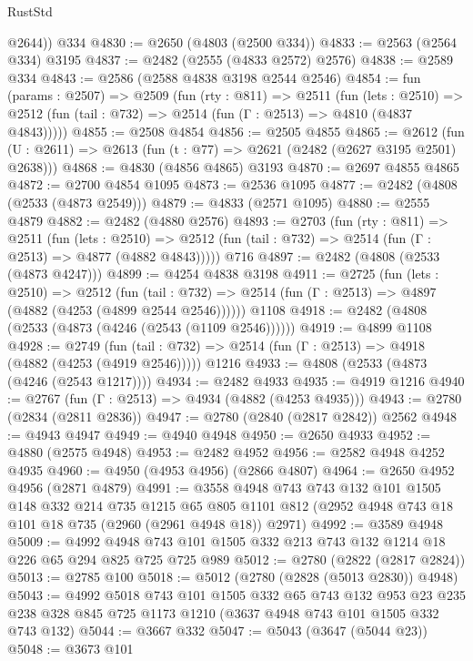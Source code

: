 \begin{lexlean}{RustStd}
\begin{coremodule}
        @2644))
    @334
@4830 := @2650 (@4803 (@2500 @334))
@4833 := @2563 (@2564 @334) @3195
@4837 := @2482 (@2555 (@4833 @2572) @2576)
@4838 := @2589 @334
@4843 := @2586 (@2588 @4838 @3198 @2544 @2546)
@4854 := fun (params : @2507) =>
  @2509
    (fun (rty : @811) =>
    @2511
      (fun (lets : @2510) =>
      @2512 (fun (tail : @732) => @2514 (fun (Γ : @2513) => @4810 (@4837 @4843)))))
@4855 := @2508 @4854
@4856 := @2505 @4855
@4865 := @2612 (fun (U : @2611) => @2613 (fun (t : @77) => @2621 (@2482 (@2627 @3195 @2501) @2638)))
@4868 := @4830 (@4856 @4865) @3193
@4870 := @2697 @4855 @4865
@4872 := @2700 @4854 @1095
@4873 := @2536 @1095
@4877 := @2482 (@4808 (@2533 (@4873 @2549)))
@4879 := @4833 (@2571 @1095)
@4880 := @2555 @4879
@4882 := @2482 (@4880 @2576)
@4893 := @2703
    (fun (rty : @811) =>
    @2511
      (fun (lets : @2510) =>
      @2512 (fun (tail : @732) => @2514 (fun (Γ : @2513) => @4877 (@4882 @4843)))))
    @716
@4897 := @2482 (@4808 (@2533 (@4873 @4247)))
@4899 := @4254 @4838 @3198
@4911 := @2725
    (fun (lets : @2510) =>
    @2512
      (fun (tail : @732) => @2514 (fun (Γ : @2513) => @4897 (@4882 (@4253 (@4899 @2544 @2546))))))
    @1108
@4918 := @2482 (@4808 (@2533 (@4873 (@4246 (@2543 (@1109 @2546))))))
@4919 := @4899 @1108
@4928 := @2749
    (fun (tail : @732) => @2514 (fun (Γ : @2513) => @4918 (@4882 (@4253 (@4919 @2546)))))
    @1216
@4933 := @4808 (@2533 (@4873 (@4246 (@2543 @1217))))
@4934 := @2482 @4933
@4935 := @4919 @1216
@4940 := @2767 (fun (Γ : @2513) => @4934 (@4882 (@4253 @4935)))
@4943 := @2780 (@2834 (@2811 @2836))
@4947 := @2780 (@2840 (@2817 @2842)) @2562
@4948 := @4943 @4947
@4949 := @4940 @4948
@4950 := @2650 @4933
@4952 := @4880 (@2575 @4948)
@4953 := @2482 @4952
@4956 := @2582 @4948 @4252 @4935
@4960 := @4950 (@4953 @4956) (@2866 @4807)
@4964 := @2650 @4952 @4956 (@2871 @4879)
@4991 := @3558
    @4948
    @743
    @743
    @132
    @101
    @1505
    @148
    @332
    @214
    @735
    @1215
    @65
    @805
    @1101
    @812
    (@2952 @4948 @743 @18 @101 @18 @735 (@2960 (@2961 @4948 @18)) @2971)
@4992 := @3589 @4948
@5009 := @4992 @4948 @743 @101 @1505 @332 @213 @743 @132 @1214 @18 @226 @65 @294 @825 @725 @725 @989
@5012 := @2780 (@2822 (@2817 @2824))
@5013 := @2785 @100
@5018 := @5012 (@2780 (@2828 (@5013 @2830)) @4948)
@5043 := @4992
    @5018
    @743
    @101
    @1505
    @332
    @65
    @743
    @132
    @953
    @23
    @235
    @238
    @328
    @845
    @725
    @1173
    @1210
    (@3637 @4948 @743 @101 @1505 @332 @743 @132)
@5044 := @3667 @332
@5047 := @5043 (@3647 (@5044 @23))
@5048 := @3673 @101

\end{coremodule}
\end{lexlean}
